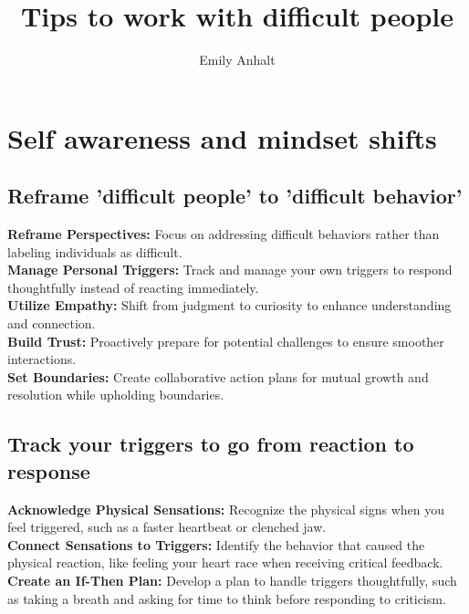 \documentclass[12pt]{article}
\begin{document}

\title{\textbf{Tips to work with difficult people}}
\author{Emily Anhalt}
\maketitle

\newpage
\tableofcontents
\newpage

\newpage
\section{Self awareness and mindset shifts}

\subsection{Reframe 'difficult people' to 'difficult behavior'}
\textbf{Reframe Perspectives:}  Focus on addressing difficult behaviors rather than labeling individuals as difficult.\\
\textbf{Manage Personal Triggers:}  Track and manage your own triggers to respond thoughtfully instead of reacting immediately.\\
\textbf{Utilize Empathy:}  Shift from judgment to curiosity to enhance understanding and connection.\\
\textbf{Build Trust:}  Proactively prepare for potential challenges to ensure smoother interactions.\\
\textbf{Set Boundaries:}  Create collaborative action plans for mutual growth and resolution while upholding boundaries.

\subsection{Track your triggers to go from reaction to response}
\textbf{Acknowledge Physical Sensations:}  Recognize the physical signs when you feel triggered, such as a faster heartbeat or clenched jaw.\\
\textbf{Connect Sensations to Triggers:}  Identify the behavior that caused the physical reaction, like feeling your heart race when receiving critical feedback.\\
\textbf{Create an If-Then Plan:}  Develop a plan to handle triggers thoughtfully, such as taking a breath and asking for time to think before responding to criticism.
\end{document}
